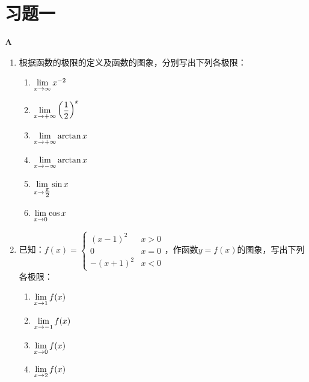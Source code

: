 \section*{习题一}
\begin{center}
\bfseries A
\end{center}

\begin{enumerate}
    \item 根据函数的极限的定义及函数的图象，分别写出下列各极限：
\begin{multicols}{3}
\begin{enumerate}[(1)]
    \item $\lim\limits_{x\to \infty}x^{-2}$
    \item $\lim\limits_{x\to +\infty}\left(\dfrac{1}{2}\right)^x$
    \item $\lim\limits_{x\to +\infty}\arctan x$
    \item $\lim\limits_{x\to -\infty}\arctan x$
    \item $\lim\limits_{x\to \tfrac{\pi}{2}}\sin x$
    \item $\lim\limits_{x\to 0} \cos x$
\end{enumerate}
\end{multicols}

\item 已知：$f(x)=\begin{cases}
    (x-1)^2 & x>0\\
    0& x=0\\
    -(x+1)^2 & x<0
\end{cases}$，作函数$y=f(x)$的图象，写出下列各极限：
\begin{multicols}{4}
\begin{enumerate}[(1)]
    \item $\lim\limits_{x\to 1}f(x)$
    \item $\lim\limits_{x\to -1}f(x)$
    \item $\lim\limits_{x\to 0}f(x)$
    \item $\lim\limits_{x\to 2}f(x)$
\end{enumerate}
\end{multicols}


\end{enumerate}
